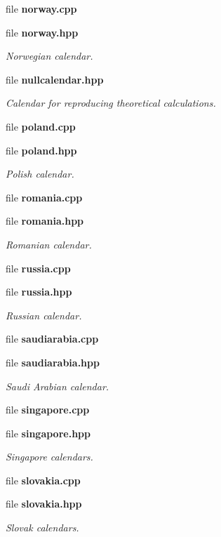 \begin{DoxyCompactItemize}
file {\bf norway.\+cpp}
\item 
file {\bf norway.\+hpp}
\begin{DoxyCompactList}\small\item\em Norwegian calendar. \end{DoxyCompactList}\item 
file {\bf nullcalendar.\+hpp}
\begin{DoxyCompactList}\small\item\em Calendar for reproducing theoretical calculations. \end{DoxyCompactList}\item 
file {\bf poland.\+cpp}
\item 
file {\bf poland.\+hpp}
\begin{DoxyCompactList}\small\item\em Polish calendar. \end{DoxyCompactList}\item 
file {\bf romania.\+cpp}
\item 
file {\bf romania.\+hpp}
\begin{DoxyCompactList}\small\item\em Romanian calendar. \end{DoxyCompactList}\item 
file {\bf russia.\+cpp}
\item 
file {\bf russia.\+hpp}
\begin{DoxyCompactList}\small\item\em Russian calendar. \end{DoxyCompactList}\item 
file {\bf saudiarabia.\+cpp}
\item 
file {\bf saudiarabia.\+hpp}
\begin{DoxyCompactList}\small\item\em Saudi Arabian calendar. \end{DoxyCompactList}\item 
file {\bf singapore.\+cpp}
\item 
file {\bf singapore.\+hpp}
\begin{DoxyCompactList}\small\item\em Singapore calendars. \end{DoxyCompactList}\item 
file {\bf slovakia.\+cpp}
\item 
file {\bf slovakia.\+hpp}
\begin{DoxyCompactList}\small\item\em Slovak calendars. \end{DoxyCompactList}\item 

\end{DoxyCompactItemize}
